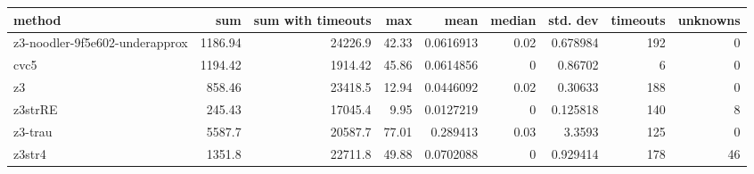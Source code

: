 \begin{tabular}{lrrrrrrrr}
\hline
 method                         &     sum &   sum with timeouts &   max &      mean &   median &   std. dev &   timeouts &   unknowns \\
\hline
 z3-noodler-9f5e602-underapprox & 1186.94 &            24226.9  & 42.33 & 0.0616913 &     0.02 &   0.678984 &        192 &          0 \\
 cvc5                           & 1194.42 &             1914.42 & 45.86 & 0.0614856 &     0    &   0.86702  &          6 &          0 \\
 z3                             &  858.46 &            23418.5  & 12.94 & 0.0446092 &     0.02 &   0.30633  &        188 &          0 \\
 z3strRE                        &  245.43 &            17045.4  &  9.95 & 0.0127219 &     0    &   0.125818 &        140 &          8 \\
 z3-trau                        & 5587.7  &            20587.7  & 77.01 & 0.289413  &     0.03 &   3.3593   &        125 &          0 \\
 z3str4                         & 1351.8  &            22711.8  & 49.88 & 0.0702088 &     0    &   0.929414 &        178 &         46 \\
\hline
\end{tabular}

